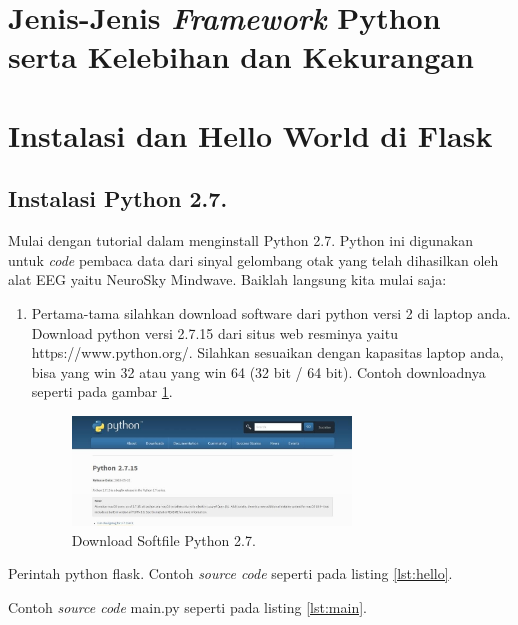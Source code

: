 \section{Jenis-Jenis \textit{Framework} Python serta Kelebihan dan Kekurangan}
\section{Instalasi dan Hello World di Flask}
\subsection{Instalasi Python 2.7.}
Mulai dengan tutorial dalam menginstall Python 2.7. Python ini digunakan untuk \textit{code} pembaca data dari sinyal gelombang otak yang telah dihasilkan oleh alat EEG yaitu NeuroSky Mindwave. Baiklah langsung kita mulai saja:
\begin{enumerate}
\item Pertama-tama silahkan download software dari python versi 2 di laptop anda. Download python versi 2.7.15 dari situs web resminya yaitu https://www.python.org/. Silahkan sesuaikan dengan kapasitas laptop anda, bisa yang win 32 atau yang win 64 (32 bit / 64 bit). Contoh downloadnya seperti pada gambar \ref{fig:python}.

\begin{figure}[!htbp]
	\includegraphics[width=0.70\textwidth]{figures/8/python.jpg}
	\caption{Download Softfile Python 2.7.}
	\label{fig:python}
\end{figure}

\end{enumerate}

Perintah python flask. Contoh \textit{source code} seperti pada listing \ref{lst:hello}.

 Contoh \textit{source code} main.py seperti pada listing \ref{lst:main}.

